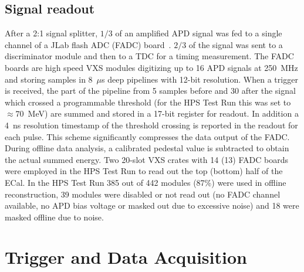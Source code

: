 \documentclass[final,3p,times,twocolumn]{elsarticle}
\begin{document}
\subsection{Signal readout}
\label{sec:fadc}
After a 2:1 signal splitter, $1/3$ of an amplified APD signal was fed to a 
single channel of a JLab flash ADC (FADC) board~\cite{fadc}. $2/3$ of the signal was sent to a 
discriminator module and then to a TDC for a timing measurement. 
The FADC boards are high speed VXS modules digitizing up to 16 APD signals 
at 250~MHz and storing samples in 8~$\mu$s deep pipelines with 12-bit resolution. 
When a trigger is received, the part 
of the pipeline from 5 samples before and 30 after the signal which crossed a programmable 
threshold (for the HPS Test Run this was set to $\approx70$~MeV) are 
summed and stored in a 17-bit register for readout. In addition a 4~ns resolution timestamp of the 
threshold crossing is reported in the readout for each pulse.
This scheme significantly compresses the data output of the FADC. During offline data analysis, a 
calibrated pedestal value is subtracted to obtain the actual summed energy.
Two 20-slot VXS crates with 14 (13) FADC boards were employed in the HPS Test Run to read out the 
top (bottom) half of the ECal.
In the HPS Test Run 385 out of 442 modules (87\%) were used in offline reconstruction, 39 modules 
were disabled or not read out (no FADC channel available, no APD bias voltage or masked out due to 
excessive noise) and 18 were masked offline due to noise. 




\section{Trigger and Data Acquisition}
\label{sec:triggerdaq}
\end{document}
